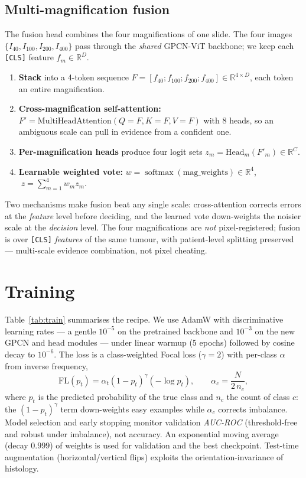 \documentclass[11pt]{article}
\newcommand{\cls}{\texttt{[CLS]}}
\DeclareMathOperator*{\softmax}{softmax}
\begin{document}
\subsection{Multi-magnification fusion}
\label{sec:multimag}
The fusion head combines the four magnifications of one slide. The four images
$\{I_{40},I_{100},I_{200},I_{400}\}$ pass through the \emph{shared} GPCN-ViT
backbone; we keep each \cls{} feature $f_m\in\mathbb{R}^{D}$.
\begin{enumerate}
  \item \textbf{Stack} into a 4-token sequence
    $F=[f_{40};f_{100};f_{200};f_{400}]\in\mathbb{R}^{4\times D}$, each token an
    entire magnification.
  \item \textbf{Cross-magnification self-attention:}
    $F'=\mathrm{MultiHeadAttention}(Q{=}F,K{=}F,V{=}F)$ with 8 heads, so an
    ambiguous scale can pull in evidence from a confident one.
  \item \textbf{Per-magnification heads} produce four logit sets
    $z_m=\mathrm{Head}_m(F'_m)\in\mathbb{R}^{C}$.
  \item \textbf{Learnable weighted vote:}
    $w=\softmax(\text{mag\_weights})\in\mathbb{R}^4$,
    $\; z=\sum_{m=1}^4 w_m z_m$.
\end{enumerate}
Two mechanisms make fusion beat any single scale: cross-attention corrects errors
at the \emph{feature} level before deciding, and the learned vote down-weights the
noisier scale at the \emph{decision} level. The four magnifications are \emph{not}
pixel-registered; fusion is over \cls{} \emph{features} of the same tumour, with
patient-level splitting preserved — multi-scale evidence combination, not pixel
cheating.

\section{Training}
\label{sec:training}

Table~\ref{tab:train} summarises the recipe. We use AdamW with discriminative
learning rates — a gentle $10^{-5}$ on the pretrained backbone and $10^{-3}$ on the
new GPCN and head modules — under linear warmup (5 epochs) followed by cosine decay
to $10^{-6}$. The loss is a class-weighted Focal loss ($\gamma=2$) with per-class
$\alpha$ from inverse frequency,
\begin{equation}
\mathrm{FL}(p_t)=\alpha_t(1-p_t)^{\gamma}(-\log p_t),\qquad
\alpha_c=\frac{N}{2\,n_c},
\label{eq:focal}
\end{equation}
where $p_t$ is the predicted probability of the true class and $n_c$ the count of
class $c$: the $(1-p_t)^\gamma$ term down-weights easy examples while $\alpha_c$
corrects imbalance. Model selection and early stopping monitor validation
\emph{AUC-ROC} (threshold-free and robust under imbalance), not accuracy. An
exponential moving average (decay $0.999$) of weights is used for validation and
the best checkpoint. Test-time augmentation (horizontal/vertical flips) exploits
the orientation-invariance of histology.
\end{document}
